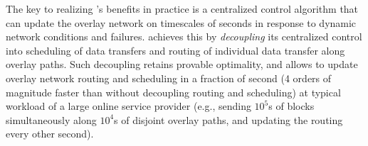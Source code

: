 

The key to realizing \name's benefits in practice is a
centralized control algorithm that can update the overlay network
on timescales of seconds in response to dynamic network conditions
and failures.
\name achieves this by {\em decoupling} its centralized control
into scheduling of data transfers and
routing of individual data transfer along overlay paths.
Such decoupling retains provable optimality, and allows
\name to update overlay network routing and scheduling in a fraction
of second (4 orders of magnitude faster than without decoupling
routing and scheduling) at typical workload
of a large online service provider (e.g., sending $10^5$s of blocks
simultaneously along $10^4$s of disjoint overlay paths, and updating
the routing every other second).



